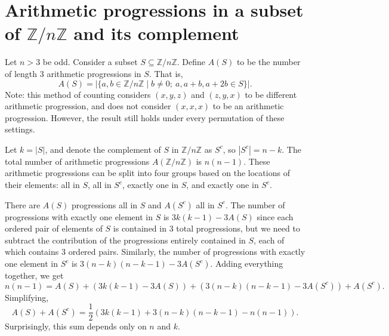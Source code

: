 \documentclass{article}
\newcommand{\p}[1]{\left(#1\right)}
\newcommand{\f}[2]{\frac{#1}{#2}}
\newcommand{\abs}[1]{\left\lvert#1\right\rvert}
\newcommand{\Z}{\mathbb{Z}}
\begin{document}
	\section*{Arithmetic progressions in a subset of $\Z/n\Z$ and its complement}

	Let $n > 3$ be odd. Consider a subset $S \subseteq \Z/n\Z$. Define $A(S)$ to be the number of length 3 arithmetic progressions in $S$. That is,
	\[ A(S) = \abs{\{a, b \in \Z/n\Z \mid b \neq 0;\ a, a + b, a + 2b \in S \}}. \]
	Note: this method of counting considers $(x, y, z)$ and $(z, y, x)$ to be different arithmetic progression, and does not consider $(x, x, x)$ to be an arithmetic progression. However, the result still holds under every permutation of these settings.

	Let $k = \abs{S}$, and denote the complement of $S$ in $\Z/n\Z$ as $S^c$, so $\abs{S^c} = n - k$. The total number of arithmetic progressions $A(\Z/n\Z)$ is $n(n-1)$. These arithmetic progressions can be split into four groups based on the locations of their elements: all in $S$, all in $S^c$, exactly one in $S$, and exactly one in $S^c$.

	There are $A(S)$ progressions all in $S$ and $A(S^c)$ all in $S^c$. The number of progressions with exactly one element in $S$ is $3k(k-1) - 3A(S)$ since each ordered pair of elements of $S$ is contained in $3$ total progressions, but we need to subtract the contribution of the progressions entirely contained in $S$, each of which contains $3$ ordered pairs. Similarly, the number of progressions with exactly one element in $S^c$ is $3(n-k)(n-k-1) - 3A(S^c)$. Adding everything together, we get
	\[ n(n-1) = A(S) + (3k(k-1) - 3A(S)) + (3(n-k)(n-k-1) - 3A(S^c)) + A(S^c). \]
	Simplifying,
	\[ A(S) + A(S^c) = \f{1}{2}\p{3k(k-1) + 3(n-k)(n-k-1) - n(n-1)}. \]
	Surprisingly, this sum depends only on $n$ and $k$.
\end{document}
